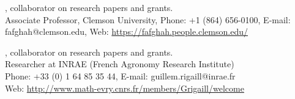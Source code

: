 \documentclass[margin,line]{res}
\begin{document}
\begin{resume}
, collaborator on research papers and grants.\\
Associate Professor, Clemson University, Phone: +1 (864) 656-0100, E-mail: fafghah@clemson.edu, Web: \url{https://fafghah.people.clemson.edu/}

, collaborator on research papers and grants.\\
Researcher at INRAE (French Agronomy Research Institute)\\
Phone: +33 (0) 1 64 85 35 44, E-mail: guillem.rigaill@inrae.fr\\
Web: \url{http://www.math-evry.cnrs.fr/members/Grigaill/welcome}

\end{resume}
\end{document}
